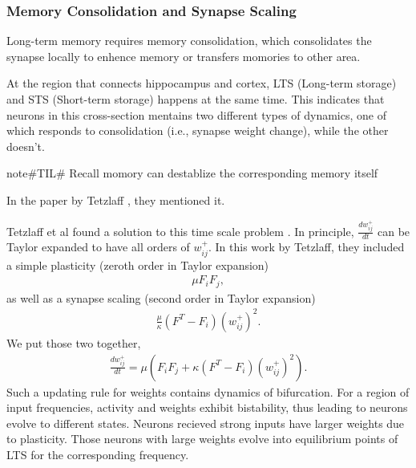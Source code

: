 \documentclass[letterpaper,10pt,english]{sphinxmanual}
\begin{document}
\subsubsection{Memory Consolidation and Synapse Scaling}
\label{\detokenize{neuroscience/memory/time-scale:memory-consolidation-and-synapse-scaling}}
Long-term memory requires memory consolidation, which consolidates the synapse locally to enhence memory or transfers momories to other area.

At the region that connects hippocampus and cortex, LTS (Long-term storage) and STS (Short-term storage) happens at the same time. This indicates that neurons in this cross-section mentains two different types of dynamics, one of which responds to consolidation (i.e., synapse weight change), while the other doesn’t.

\begin{sphinxadmonition}{note}{\#TIL\# Recall momory can destablize the corresponding memory itself}

In the paper by Tetzlaff \label{\detokenize{neuroscience/memory/time-scale:id2}}{\hyperref[\detokenize{neuroscience/memory/time-scale:tetzlaff2013}]{\sphinxcrossref{{[}Tetzlaff2013{]}}}}, they mentioned it.
\end{sphinxadmonition}

Tetzlaff et al found a solution to this time scale problem \label{\detokenize{neuroscience/memory/time-scale:id3}}{\hyperref[\detokenize{neuroscience/memory/time-scale:tetzlaff2013}]{\sphinxcrossref{{[}Tetzlaff2013{]}}}}. In principle, \(\frac{d w^{+}_{ij}}{dt}\) can be Taylor expanded to have all orders of \(w^{+}_{ij}\). In this work by Tetzlaff, they included a simple plasticity (zeroth order in Taylor expansion)
\begin{equation*}
\begin{split}\mu F_{i} F_{j},\end{split}
\end{equation*}
as well as a synapse scaling (second order in Taylor expansion)
\begin{equation*}
\begin{split}\frac{\mu}{\kappa} (F^T - F_i) \left( w^{+}_{ij} \right)^2.\end{split}
\end{equation*}
We put those two together,
\begin{equation*}
\begin{split}\frac{d w^{+}_{ij}}{dt} = \mu \left( F_{i} F_{j} +  \kappa (F^T - F_i) \left( w^{+}_{ij} \right)^2 \right).\end{split}
\end{equation*}
Such a updating rule for weights contains dynamics of bifurcation. For a region of input frequencies, activity and weights exhibit bistability, thus leading to neurons evolve to different states. Neurons recieved strong inputs have larger weights due to plasticity. Those neurons with large weights evolve into equilibrium points of LTS for the corresponding frequency.
\end{document}
